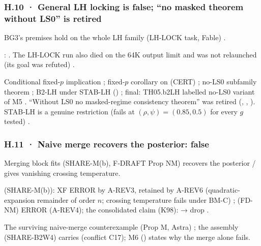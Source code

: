 \subsubsection*{H.10 · General LH locking is false; ``no masked theorem without LS0'' is retired}
\begin{description}[leftmargin=1.3em,style=unboxed,font=\normalfont]
\item[\textbf{Claim.}] BG3's premises hold on the whole LH family (LH-LOCK task, Fable) .
\item[\textbf{Failed.}] :  . The LH-LOCK run also died on the 64K output limit and was not relaunched (its goal was refuted) .
\item[\textbf{Replacement.}] Conditional fixed-$p$ implication ; fixed-$p$ corollary on (CERT) ; no-LS0 subfamily theorem ; B2-LH under STAB-LH  () ; final: TH05.b2LH labelled no-LS0 variant of M5 . ``Without LS0 no masked-regime consistency theorem'' was retired (, , ). STAB-LH is a genuine restriction (fails at $(\rho,\psi)=(0.85,0.5)$ for every $g$ tested) .
\end{description}

\subsubsection*{H.11 · Naive merge recovers the posterior: false}
\begin{description}[leftmargin=1.3em,style=unboxed,font=\normalfont]
\item[\textbf{Claim.}] Merging block fits (SHARE-M(b), F-DRAFT Prop NM) recovers the posterior / gives vanishing crossing temperature.
\item[\textbf{Failed.}]  (SHARE-M(b)): XF ERROR by A-REV3, retained by A-REV6 (quadratic-expansion remainder of order $n$; crossing temperature fails under BM-C) ;  (FD-NM) ERROR (A-REV4); the consolidated claim  (K98):   → drop .
\item[\textbf{Replacement.}] The surviving naive-merge counterexample  (Prop M, Astra) ; the assembly  (SHARE-B2W4) carries   (conflict C17); M6 () states why the merge alone fails.
\end{description}

